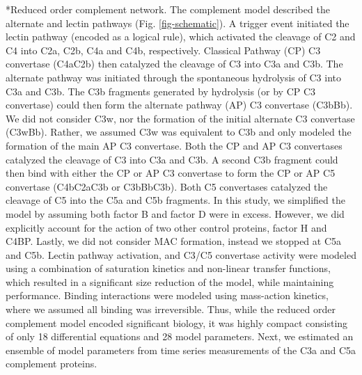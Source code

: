 \documentclass[12pt]{article}
\makeatletter
\renewcommand\subsection{\@startsection
	{subsection}{2}{0mm}
	{-0.05in}
	{-0.5\baselineskip}
	{\normalfont\normalsize\bfseries}}
\makeatother
\begin{document}
\subsection*{Reduced order complement network.}
The complement model described the alternate and lectin pathways (Fig. \ref{fig-schematic}).
A trigger event initiated the lectin pathway (encoded as a logical rule), which activated the cleavage of C2 and C4 into C2a, C2b, C4a and C4b, respectively.
Classical Pathway (CP) C3 convertase (C4aC2b) then catalyzed the cleavage of C3 into C3a and C3b.
The alternate pathway was initiated through the spontaneous hydrolysis of C3 into C3a and C3b.
The C3b fragments generated by hydrolysis (or by CP C3 convertase) could then form the alternate pathway (AP) C3 convertase (C3bBb).
We did not consider C3w, nor the formation of the initial alternate C3 convertase (C3wBb).
Rather, we assumed C3w was equivalent to C3b and only modeled the formation of the main AP C3 convertase.
Both the CP and AP C3 convertases catalyzed the cleavage of C3 into C3a and C3b.
A second C3b fragment could then bind with either the CP or AP C3 convertase to form the CP or AP C5 convertase (C4bC2aC3b or C3bBbC3b).
Both C5 convertases catalyzed the cleavage of C5 into the C5a and C5b fragments.
In this study, we simplified the model by assuming both factor B and factor D were in excess.
However, we did explicitly account for the action of two other control proteins, factor H and C4BP.
Lastly, we did not consider MAC formation, instead we stopped at C5a and C5b.
Lectin pathway activation, and C3/C5 convertase activity were modeled using a combination of saturation kinetics and non-linear transfer functions,
which resulted in a significant size reduction of the model, while maintaining performance.
Binding interactions were modeled using mass-action kinetics, where we assumed all binding was irreversible.
Thus, while the reduced order complement model encoded significant biology, it was highly compact consisting of only 18 differential equations and 28 model parameters.
Next, we estimated an ensemble of model parameters from time series measurements of the C3a and C5a complement proteins.
\end{document}
